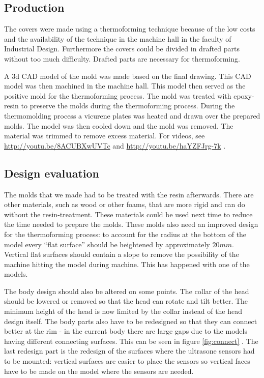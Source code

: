 \documentclass[technical_document.tex]{subfiles}
\begin{document}
\subsection{Production} 
The covers were made using a thermoforming technique because of the low costs and the availability of the technique in the machine hall in the faculty of Industrial Design. Furthermore the covers could be divided in drafted parts without too much difficulty. Drafted parts are necessary for thermoforming.

A 3d CAD model of the mold was made based on the final drawing. This CAD model was then machined in the machine hall. This model then served as the positive mold for the thermoforming process. The mold was treated with epoxy-resin to preserve the molds during the thermoforming process. During the thermomolding process a vicurene plates was heated and drawn over the prepared molds. The model was then cooled down and the mold was removed. The material was trimmed to remove excess material. For videos, see  \url{http://youtu.be/8ACUBXwUVTc} and \url{http://youtu.be/haYZFJrg-7k} .

\subsection{Design evaluation}
The molds that we made had to be treated with the resin afterwards. There are other materials, such as wood or other foams, 
that are more rigid and can do without the resin-treatment. These materials could be used next time to reduce the time 
needed to prepare the molds. These molds also need an improved design for the thermoforming process: to account for the 
radius at the bottom of the model every ``flat surface'' should be heightened by approximately $20 mm$. Vertical flat surfaces should contain a slope to remove the possibility of the machine hitting the model during machine. This has happened with one of the models.

The body design should also be altered on some points. The collar of the head should be lowered or removed so that the head can rotate and tilt better. The minimum height of the head is now limited by the collar instead of the head design itself. The body parts also have to be redesigned so that they can connect better at the rim - in the current body there are large gaps due to the models having different connecting surfaces. This can be seen in figure \ref{fig:connect} . The last redesign part is the redesign of the surfaces where the ultrasone sensors had to be mounted: vertical surfaces are easier to place the sensors so vertical faces have to be made on the model where the sensors are needed.
\end{document}

